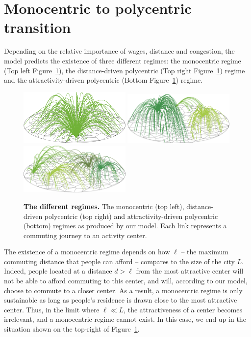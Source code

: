 \section{Monocentric to polycentric transition}
\label{sub:monocentric_to_polycentric_transition}

Depending on the relative importance of wages, distance and congestion, the
model predicts the existence of three different regimes: the monocentric regime
(Top left Figure~\ref{fig:model_results}), the distance-driven polycentric (Top
right Figure~\ref{fig:model_results}) regime and the attractivity-driven
polycentric (Bottom Figure~\ref{fig:model_results}) regime.\\


\begin{figure}
    \centering
    \includegraphics[width=0.49\textwidth]{gfx/chapter-monocentric/1.pdf}
    \includegraphics[width=0.49\textwidth]{gfx/chapter-monocentric/2.pdf}
    \includegraphics[width=0.49\textwidth]{gfx/chapter-monocentric/3.pdf}
    \caption{{\bf The different regimes.} The monocentric (top left), distance-driven polycentric (top right)
      and attractivity-driven polycentric (bottom) regimes as produced by
      our model. Each link represents a commuting journey to an activity center. \label{fig:model_results}}
\end{figure}

The existence of a monocentric regime depends on how $\ell$ -- the maximum
commuting distance that people can afford -- compares to the size of the city
$L$. Indeed, people located at a distance $d > \ell$ from the most
attractive center will not be able to afford commuting to this center, and will,
according to our model, choose to commute to a closer center.  As a result, a
monocentric regime is only sustainable as long as people's residence is drawn
close to the most attractive center. Thus, in the limit where $\ell \ll L$, the
attractiveness of a center becomes irrelevant, and a monocentric regime cannot
exist. In this case, we end up in the situation shown on the top-right of
Figure~\ref{fig:model_results}.\\


